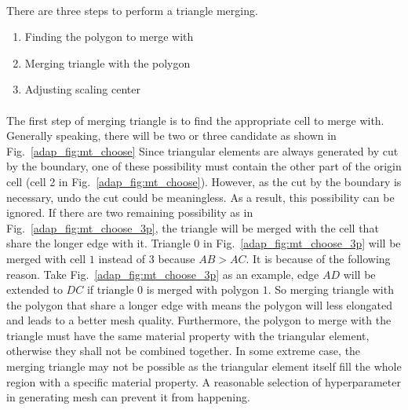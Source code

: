 \paragraph{}
There are three steps to perform a triangle merging.
\begin{enumerate}
    \item Finding the polygon to merge with
    \item Merging triangle with the polygon
    \item Adjusting scaling center
\end{enumerate}

\paragraph{}
The first step of merging triangle is to find the appropriate cell to merge with.
Generally speaking, there will be two or three candidate as shown in Fig.~\ref{adap_fig:mt_choose}
Since triangular elements are always generated by cut by the boundary, one of these possibility must contain the other part of the origin cell (cell 2 in Fig.~\ref{adap_fig:mt_choose}).
However, as the cut by the boundary is necessary, undo the cut could be meaningless.
As a result, this possibility can be ignored.
If there are two remaining possibility as in Fig.~\ref{adap_fig:mt_choose_3p}, the triangle will be merged with the cell that share the longer edge with it.
Triangle $0$ in Fig.~\ref{adap_fig:mt_choose_3p} will be merged with cell $1$ instead of $3$ because $AB > AC$.
It is because of the following reason.
Take Fig.~\ref{adap_fig:mt_choose_3p} as an example, edge $AD$ will be extended to $DC$ if triangle $0$ is merged with polygon $1$.
So merging triangle with the polygon that share a longer edge with means the polygon will less elongated and leads to a better mesh quality.
Furthermore, the polygon to merge with the triangle must have the same material property with the triangular element, otherwise they shall not be combined together.
In some extreme case, the merging triangle may not be possible as the triangular element itself fill the whole region with a specific material property.
A reasonable selection of hyperparameter in generating mesh can prevent it from happening.

